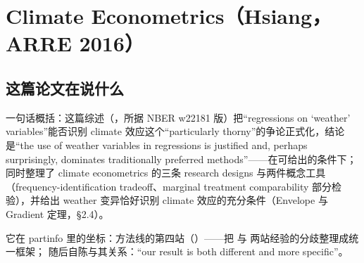 
\chapter{Climate Econometrics（Hsiang，ARRE 2016）}
\label{ch:hsiang-2016}

\section{这篇论文在说什么}

一句话概括：这篇综述（\citealp{hsiang2016climate}，所据 NBER w22181 版）把``regressions on `weather' variables''\citep[第~2 页]{hsiang2016climate}能否识别 climate 效应这个``particularly thorny''\citep[第~2 页]{hsiang2016climate}的争论正式化，结论是``the use of weather variables in regressions is justified and, perhaps surprisingly, dominates traditionally preferred methods''\citep[第~2 页]{hsiang2016climate}——在可给出的条件下；同时整理了 climate econometrics 的三条 research designs 与两件概念工具（frequency-identification tradeoff、marginal treatment comparability 部分检验），并给出 weather 变异恰好识别 climate 效应的充分条件（Envelope 与 Gradient 定理，\S 2.4）。

它在 partinfo 里的坐标：方法线的第四站（）——把  与  两站经验的分歧整理成统一框架； 随后自陈与其关系：``our result is both different and more specific''\citep[第~1217 页]{merel2021climate}。


